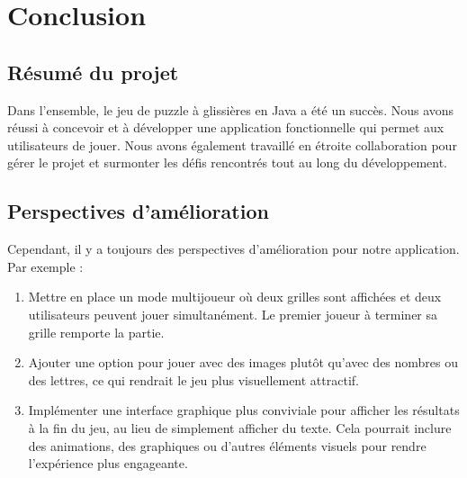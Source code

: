 \documentclass[a4paper,10pt]{article}
\begin{document}
\section{Conclusion}

\subsection{Résumé du projet}
Dans l'ensemble, le jeu de puzzle à glissières en Java a été un succès. Nous avons réussi à concevoir et à développer une application fonctionnelle qui permet aux utilisateurs de jouer. Nous avons également travaillé en étroite collaboration pour gérer le projet et surmonter les défis rencontrés tout au long du développement.
\subsection{Perspectives d'amélioration}
Cependant, il y a toujours des perspectives d'amélioration pour notre application. Par exemple :

\begin{enumerate}
    \item Mettre en place un mode multijoueur où deux grilles sont affichées et deux utilisateurs peuvent jouer simultanément. Le premier joueur à terminer sa grille remporte la partie.
    
    \item Ajouter une option pour jouer avec des images plutôt qu'avec des nombres ou des lettres, ce qui rendrait le jeu plus visuellement attractif.
    
    \item Implémenter une interface graphique plus conviviale pour afficher les résultats à la fin du jeu, au lieu de simplement afficher du texte. Cela pourrait inclure des animations, des graphiques ou d'autres éléments visuels pour rendre l'expérience plus engageante.
\end{enumerate}
\end{document}
